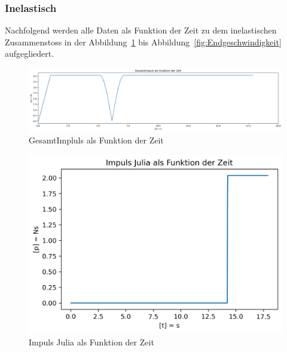 \documentclass[../main.tex]{subfiles}
\begin{document}
    \subsubsection{Inelastisch}
    Nachfolgend werden alle Daten als Funktion der Zeit zu dem inelastischen Zusammenstoss in der
    Abbildung~\ref{fig:gesamtImpluls} bis Abbildung~\ref{fig:Endgeschwindigkeit}
    aufgegliedert.

    \begin{figure}[H]
        \begin{center}
            \centerline{\includegraphics[width=155mm]{./images/Inelastisch/GesamtImpluls}}
            \caption{GesamtImpluls als Funktion der Zeit}
            \label{fig:gesamtImpluls}
        \end{center}
    \end{figure}

    \begin{figure}[H]
        \begin{center}
            \centerline{\includegraphics[width=155mm]{./images/Inelastisch/ImpulsJulia}}
            \caption{Impuls Julia als Funktion der Zeit}
            \label{fig:ImpulsJulia}
        \end{center}
    \end{figure}
\end{document}
